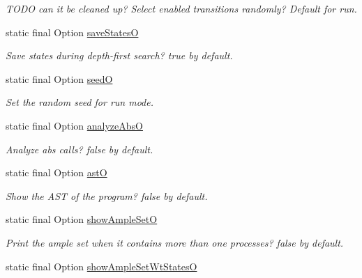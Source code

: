 \begin{DoxyCompactItemize}
\begin{DoxyCompactList}\small\item\em T\+O\+D\+O can it be cleaned up? Select enabled transitions randomly? Default for run. \end{DoxyCompactList}\item 
static final Option \hyperlink{classedu_1_1udel_1_1cis_1_1vsl_1_1civl_1_1config_1_1IF_1_1CIVLConstants_adb4196804e911d1b2d5591d975c76189}{save\+States\+O}
\begin{DoxyCompactList}\small\item\em Save states during depth-\/first search? true by default. \end{DoxyCompactList}\item 
static final Option \hyperlink{classedu_1_1udel_1_1cis_1_1vsl_1_1civl_1_1config_1_1IF_1_1CIVLConstants_ad1d435f50cd553d105059ce1a183696a}{seed\+O}
\begin{DoxyCompactList}\small\item\em Set the random seed for run mode. \end{DoxyCompactList}\item 
static final Option \hyperlink{classedu_1_1udel_1_1cis_1_1vsl_1_1civl_1_1config_1_1IF_1_1CIVLConstants_a575724593ef209d8cf8278c599f00410}{analyze\+Abs\+O}
\begin{DoxyCompactList}\small\item\em Analyze abs calls? false by default. \end{DoxyCompactList}\item 
static final Option \hyperlink{classedu_1_1udel_1_1cis_1_1vsl_1_1civl_1_1config_1_1IF_1_1CIVLConstants_a18c5831b00f6a2eff48de19a2a6988ff}{ast\+O}
\begin{DoxyCompactList}\small\item\em Show the A\+S\+T of the program? false by default. \end{DoxyCompactList}\item 
static final Option \hyperlink{classedu_1_1udel_1_1cis_1_1vsl_1_1civl_1_1config_1_1IF_1_1CIVLConstants_a0182732f0052855a760e031dfe7b6217}{show\+Ample\+Set\+O}
\begin{DoxyCompactList}\small\item\em Print the ample set when it contains more than one processes? false by default. \end{DoxyCompactList}\item 
static final Option \hyperlink{classedu_1_1udel_1_1cis_1_1vsl_1_1civl_1_1config_1_1IF_1_1CIVLConstants_af4bda824bd19eb7b681e4cdf2bcea519}{show\+Ample\+Set\+Wt\+States\+O}

\end{DoxyCompactItemize}
